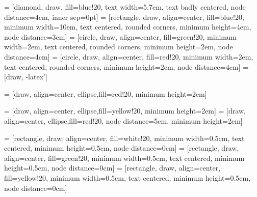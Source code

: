  = [diamond, draw, fill=blue!20, 
    text width=5.7em, text badly centered, node distance=4cm, inner sep=0pt]
 = [rectangle, draw, align=center, fill=blue!20, minimum width=10em,
	text centered, rounded corners, minimum height=4em, node distance=3cm]
 = [circle, draw, align=center, fill=green!20, minimum width=2em,
	text centered, rounded corners, minimum height=2em, node distance=4cm]
 = [circle, draw, align=center, fill=red!20, minimum width=2em,
	text centered, rounded corners, minimum height=2em, node distance=4cm]
 = [draw, -latex']

 = [draw, align=center, ellipse,fill=red!20,
    minimum height=2em]
    
 = [draw, align=center, ellipse,fill=yellow!20,
    minimum height=2em]
 = [draw, align=center, ellipse,fill=red!20, node distance=5cm,
    minimum height=2em]

 = [rectangle, draw, align=center, fill=white!20, minimum width=0.5cm,
	text centered, minimum height=0.5cm, node distance=0cm]
 = [rectangle, draw, align=center, fill=green!20, minimum width=0.5cm,
	text centered, minimum height=0.5cm, node distance=0cm]
 = [rectangle, draw, align=center, fill=yellow!20, minimum width=0.5cm,
	text centered, minimum height=0.5cm, node distance=0cm]
	
